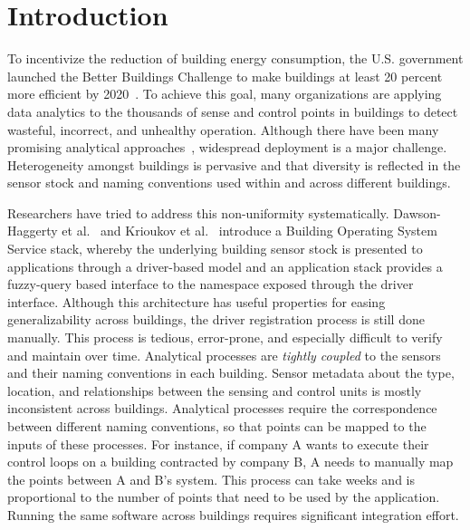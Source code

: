\section{Introduction}

To incentivize the reduction of building energy consumption, the U.S. government 
launched the Better Buildings Challenge to make buildings at least 20 percent 
more efficient by 2020~\cite{doe2013better}. To achieve this goal, many organizations 
are applying data analytics to the thousands of sense and control points in 
buildings to detect wasteful, incorrect, and unhealthy operation.  
Although there have been many promising analytical approaches~\cite{}, widespread deployment is a 
major challenge.  Heterogeneity amongst buildings is pervasive and that diversity is reflected
in the sensor stock and naming conventions used within and across different buildings.

Researchers have tried to address this non-uniformity systematically.
Dawson-Haggerty et al.~\cite{boss} and Krioukov et al.~\cite{bas}
introduce a Building Operating System Service stack, whereby
the underlying building sensor stock is presented to applications through a driver-based model and 
an application stack 
provides a fuzzy-query based interface to the namespace exposed through the driver interface.
Although this architecture has useful properties  for easing generalizability across
buildings, the driver registration process is still done manually. This process is tedious, error-prone, 
and especially difficult to verify and maintain over time.  
Analytical processes are \emph{tightly coupled} to the sensors and their naming conventions in each building. 
Sensor metadata about the type, location, and relationships between the sensing 
and control units is mostly inconsistent across buildings.
Analytical processes require the correspondence between different naming 
conventions, so that points can be mapped to the inputs of these processes.
For instance, if company A wants to execute their 
control loops on a building contracted by company B, A needs to manually 
map the points between A and B's system. This process can take weeks and is proportional 
to the number of points that need to be used by the application. Running the same software across 
buildings requires significant integration effort.




